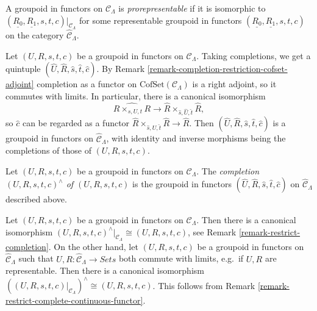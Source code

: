 \begin{definition}
\label{definition-prorepresentable-groupoid-in-functors}
A groupoid in functors on $\mathcal{C}_\Lambda$ is {\it prorepresentable}
if it is isomorphic to
$(\underline{R_0}, \underline{R_1}, s, t, c)|_{\mathcal{C}_\Lambda}$
for some representable groupoid in functors
$(\underline{R_0}, \underline{R_1}, s, t, c)$ on the category
$\widehat{\mathcal{C}}_\Lambda$.
\end{definition}

\noindent
Let $(U, R, s, t, c)$ be a groupoid in functors on $\mathcal{C}_\Lambda$.
Taking completions, we get a quintuple
$(\widehat{U}, \widehat{R}, \widehat{s}, \widehat{t}, \widehat{c})$. By
Remark \ref{remark-completion-restriction-cofset-adjoint}
completion as a functor on $\text{CofSet}(\mathcal{C}_\Lambda)$ is a right
adjoint, so it commutes with limits. In particular, there is a canonical
isomorphism
$$
\widehat{R \times_{s, U, t} R}
\longrightarrow
\widehat{R} \times_{\widehat{s}, \widehat{U}, \widehat{t}} \widehat{R},
$$
so $\widehat{c}$ can be regarded as a functor
$\widehat{R} \times_{\widehat{s}, \widehat{U}, \widehat{t}} \widehat{R} \to
\widehat{R}$. Then
$(\widehat{U}, \widehat{R}, \widehat{s}, \widehat{t}, \widehat{c})$
is a groupoid in functors on $\widehat{\mathcal{C}}_\Lambda$, with
identity and inverse morphisms being the completions of those of
$(U, R, s, t, c)$.

\begin{definition}
\label{definition-completion-groupoid-in-functors}
Let $(U, R, s, t, c)$ be a groupoid in functors on $\mathcal{C}_\Lambda$.
The {\it completion $(U, R, s, t, c)^{\wedge}$ of $(U, R, s, t, c)$} is the
groupoid in functors
$(\widehat{U}, \widehat{R}, \widehat{s}, \widehat{t}, \widehat{c})$
on $\widehat{\mathcal{C}}_\Lambda$ described above.
\end{definition}

\begin{remark}
\label{remark-groupoid-in-functors-complete-restrict}
Let $(U, R, s, t, c)$ be a groupoid in functors on $\mathcal{C}_\Lambda$.
Then there is a canonical isomorphism
$(U, R, s, t, c)^{\wedge}|_{\mathcal{C}_\Lambda} \cong (U, R, s, t, c)$, see
Remark \ref{remark-restrict-completion}.
On the other hand, let $(U, R, s, t, c)$ be a groupoid in functors on
$\widehat{\mathcal{C}}_\Lambda$ such that
$U, R : \widehat{\mathcal{C}}_\Lambda \to \textit{Sets}$
both commute with limits, e.g.\ if $U, R$ are representable.
Then there is a canonical isomorphism
$((U, R, s, t, c)|_{\mathcal{C}_\Lambda})^{\wedge} \cong (U, R, s, t, c)$.
This follows from
Remark \ref{remark-restrict-complete-continuous-functor}.
\end{remark}

